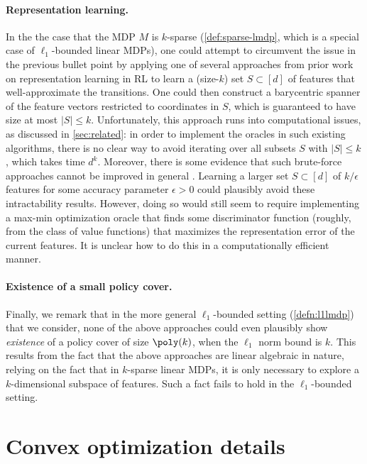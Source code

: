 \documentclass[11pt, oneside]{article}
\theoremstyle{plain}
\theoremstyle{definition}
\numberwithin{theorem}{section}
\renewcommand{\^}[1]{^{(#1)}}
\begin{document}
\paragraph{Representation learning.} In the the case that the MDP $M$ is $k$-sparse (\cref{def:sparse-lmdp}, which is a special case of $\ell_1$-bounded linear MDPs), one could attempt to circumvent the issue in the previous bullet point by applying one of several approaches from prior work on representation learning in RL \cite{modi2021model, zhang2022efficient, mhammedi2023efficient} to learn a (size-$k$) set $S \subset [d]$ of features that well-approximate the transitions. One could then construct a barycentric spanner of the feature vectors restricted to coordinates in $S$, which is guaranteed to have size at most $|S| \leq k$. Unfortunately, this approach runs into computational issues, as discussed in \cref{sec:related}: in order to implement the oracles in such existing algorithms, there is no clear way to avoid iterating over all subsets $S$ with $|S| \leq k$, which takes time $d^k$. Moreover, there is some evidence that such brute-force approaches cannot be improved in general \cite{gupte2020fine, zhang2014lower}. Learning a larger set $S\subset [d]$ of $k/\epsilon$ features for some accuracy parameter $\epsilon>0$ could plausibly avoid these intractability results. However, doing so would still seem to require implementing a max-min optimization oracle that finds some discriminator function (roughly, from the class of value functions) that maximizes the representation error of the current features. It is unclear how to do this in a computationally efficient manner.




\paragraph{Existence of a small policy cover.} Finally, we remark that in the more general $\ell_1$-bounded setting (\cref{defn:l1lmdp}) that we consider, none of the above approaches could even plausibly show \emph{existence} of a policy cover of size $\poly(k)$, when the $\ell_1$ norm bound is $k$. This results from the fact that the above approaches are linear algebraic in nature, relying on the fact that in $k$-sparse linear MDPs, it is only necessary to explore a $k$-dimensional subspace of features. Such a fact fails to hold in the $\ell_1$-bounded setting. 


\section{Convex optimization details}\label{sec:opt-details}
\end{document}
